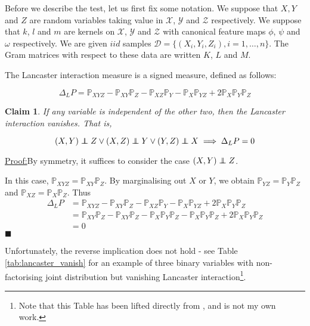 \documentclass[12pt]{article}
\newcommand\independent{\protect\mathpalette{\protect\independenT}{\perp}}
\def\independenT#1#2{\mathrel{\rlap{$#1#2$}\mkern2mu{#1#2}}}
\newtheorem{claim}{Claim}
\newenvironment{claimproof}[1]{\par\noindent\underline{Proof:}\space#1}{\hfill $\blacksquare$}
\numberwithin{claim}{section}
\numberwithin{lemma}{section}
\numberwithin{theorem}{section}
\begin{document}
Before we describe the test, let us first fix some notation. We suppose that $X, Y$ and $Z$ are random variables taking value in $\mathcal{X}$, $\mathcal{Y}$ and $\mathcal{Z}$ respectively. We suppose that $k$, $l$ and $m$ are kernels on $\mathcal{X}$, $\mathcal{Y}$ and $\mathcal{Z}$ with canonical feature maps $\phi$, $\psi$ and $\omega$ respectively. We are given $iid$ samples $\mathcal{D} = \{(X_i,Y_i,Z_i), i=1,\ldots,n\}$. The Gram matrices with respect to these data are written $K$, $L$ and $M$. 

The Lancaster interaction measure is a signed measure, defined as follows:

\[\Delta_LP = \mathbb{P}_{XYZ} - \mathbb{P}_{XY}\mathbb{P}_{Z} - \mathbb{P}_{XZ}\mathbb{P}_{Y} - \mathbb{P}_{X}\mathbb{P}_{YZ} +2\mathbb{P}_{X}\mathbb{P}_{Y}\mathbb{P}_{Z} \]

\begin{claim} If any variable is independent of the other two, then the Lancaster interaction vanishes. That is, 

\[(X,Y) \independent Z \lor (X,Z) \independent Y \lor (Y,Z) \independent X \implies \Delta_LP = 0\]

\end{claim}

\begin{claimproof}
By symmetry, it suffices to consider the case $(X,Y) \independent Z$.

In this case, $\mathbb{P}_{XYZ} = \mathbb{P}_{XY}\mathbb{P}_{Z}$. By marginalising out $X$ or $Y$, we obtain  $\mathbb{P}_{YZ} = \mathbb{P}_{Y}\mathbb{P}_{Z}$ and  $\mathbb{P}_{XZ} = \mathbb{P}_{X}\mathbb{P}_{Z}$. Thus
\begin{align*}
\Delta_LP &= \mathbb{P}_{XYZ} - \mathbb{P}_{XY}\mathbb{P}_{Z} - \mathbb{P}_{XZ}\mathbb{P}_{Y} - \mathbb{P}_{X}\mathbb{P}_{YZ} +2\mathbb{P}_{X}\mathbb{P}_{Y}\mathbb{P}_{Z} \\
&= \mathbb{P}_{XY}\mathbb{P}_{Z} - \mathbb{P}_{XY}\mathbb{P}_{Z} - \mathbb{P}_{X}\mathbb{P}_{Y}\mathbb{P}_{Z} - \mathbb{P}_{X} \mathbb{P}_{Y}\mathbb{P}_{Z} +2\mathbb{P}_{X}\mathbb{P}_{Y}\mathbb{P}_{Z} \\
&= 0
\end{align*}
\end{claimproof}

Unfortunately, the reverse implication does not hold - see Table \ref{tab:lancaster_vanish} for an example of three binary variables with non-factorising joint distribution but vanishing Lancaster interaction\footnote{Note that this Table has been lifted directly from \cite{sejdinovic2013kernel}, and is not my own work.}.
\end{document}
